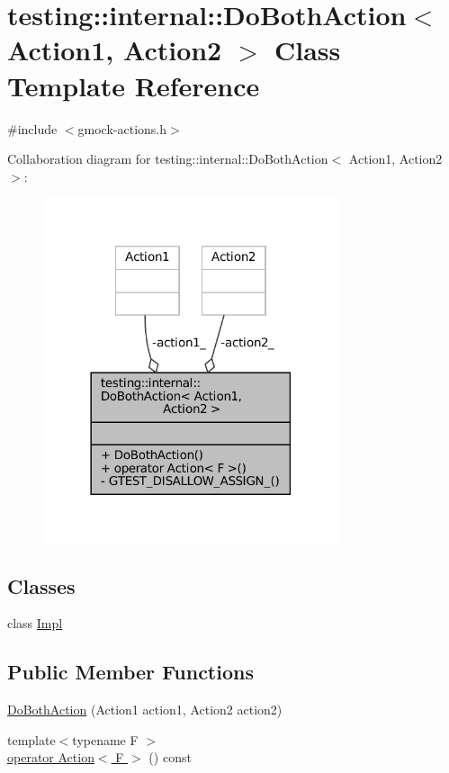 \hypertarget{classtesting_1_1internal_1_1DoBothAction}{}\section{testing\+:\+:internal\+:\+:Do\+Both\+Action$<$ Action1, Action2 $>$ Class Template Reference}
\label{classtesting_1_1internal_1_1DoBothAction}


{\ttfamily \#include $<$gmock-\/actions.\+h$>$}



Collaboration diagram for testing\+:\+:internal\+:\+:Do\+Both\+Action$<$ Action1, Action2 $>$\+:
\nopagebreak
\begin{figure}[H]
\begin{center}
\leavevmode
\includegraphics[width=246pt]{classtesting_1_1internal_1_1DoBothAction__coll__graph}
\end{center}
\end{figure}
\subsection*{Classes}
\begin{DoxyCompactItemize}
\item 
class \hyperlink{classtesting_1_1internal_1_1DoBothAction_1_1Impl}{Impl}
\end{DoxyCompactItemize}
\subsection*{Public Member Functions}
\begin{DoxyCompactItemize}
\item 
\hyperlink{classtesting_1_1internal_1_1DoBothAction_a55727c4dbdc1816ba6f1fe124e96088b}{Do\+Both\+Action} (Action1 action1, Action2 action2)
\item 
{\footnotesize template$<$typename F $>$ }\\\hyperlink{classtesting_1_1internal_1_1DoBothAction_a35733e2f117daad110bfbd3de84634a6}{operator Action$<$ F $>$} () const
\end{DoxyCompactItemize}
